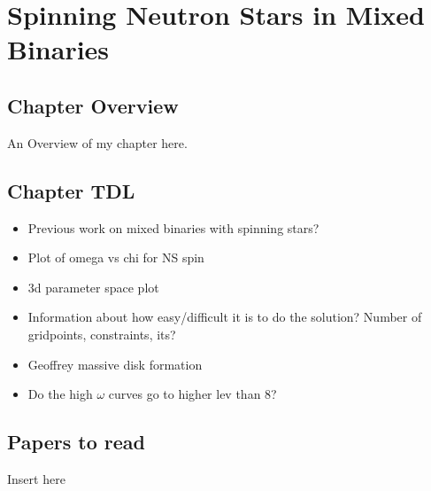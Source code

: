 \chapter{Spinning Neutron Stars in Mixed Binaries}

\section{Chapter Overview}

An Overview of my chapter here.

\section{Chapter TDL}
\begin{itemize}
\item Previous work on mixed binaries with spinning stars?
\item Plot of omega vs chi for NS spin
\item 3d parameter space plot
\item Information about how easy/difficult it is to do the solution?
  Number of gridpoints, constraints, its?
\item Geoffrey massive disk formation 
\item Do the high $\omega$ curves go to higher lev than 8?
\end{itemize}


\section{Papers to read}

Insert here







